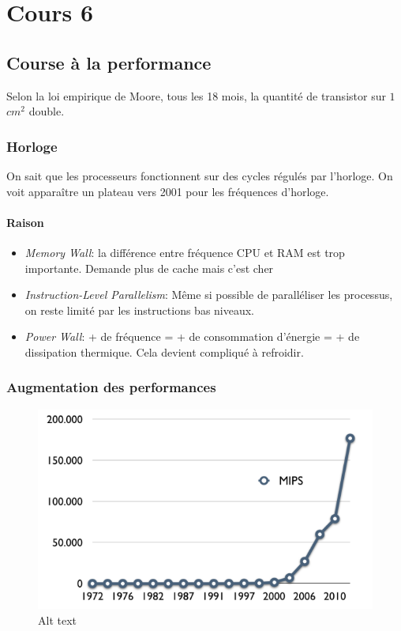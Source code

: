 \section{Cours 6}\label{cours-6}

\subsection{Course à la performance}\label{course-uxe0-la-performance}

Selon la loi empirique de Moore, tous les 18 mois, la quantité de
transistor sur \(1\) \(cm^2\) double.

\subsubsection{Horloge}\label{horloge}

On sait que les processeurs fonctionnent sur des cycles régulés par
l'horloge. On voit apparaître un plateau vers 2001 pour les fréquences
d'horloge.

\paragraph{Raison}\label{raison}

\begin{itemize}
\tightlist
\item
  \emph{Memory Wall}: la différence entre fréquence CPU et RAM est trop
  importante. Demande plus de cache mais c'est cher
\item
  \emph{Instruction-Level Parallelism}: Même si possible de paralléliser
  les processus, on reste limité par les instructions bas niveaux.
\item
  \emph{Power Wall}: + de fréquence = + de consommation d'énergie = + de
  dissipation thermique. Cela devient compliqué à refroidir.
\end{itemize}

\subsubsection{Augmentation des
performances}\label{augmentation-des-performances}

\begin{figure}
\centering
\includegraphics{image-22.png}
\caption{Alt text}
\end{figure}

